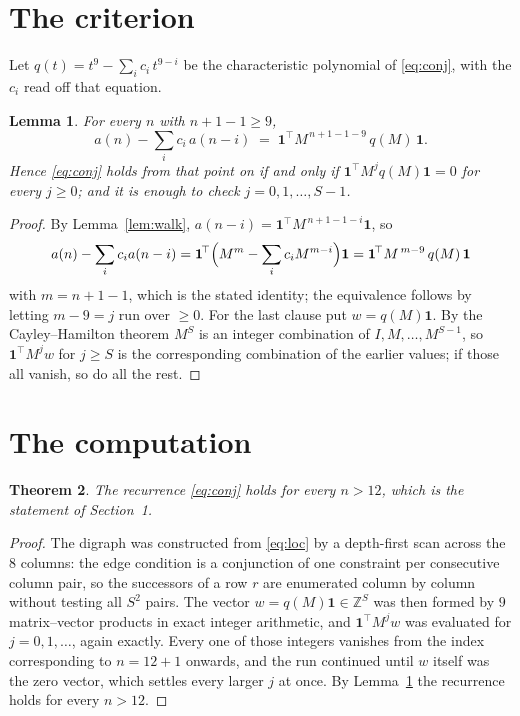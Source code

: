 \documentclass[11pt,a4paper]{article}
\theoremstyle{plain}
\newtheorem{theorem}{Theorem}
\newtheorem{lemma}[theorem]{Lemma}
\theoremstyle{definition}
\begin{document}
\section{The criterion}

Let $q(t)=t^{9}-\sum_i c_i\,t^{9-i}$ be the characteristic polynomial of
\eqref{eq:conj}, with the $c_i$ read off that equation.

\begin{lemma}\label{lem:crit}
For every $n$ with $n+1-1\ge9$,
\[
a(n)-\sum_i c_i\,a(n-i)\;=\;\mathbf{1}^{\!\top}M^{\,n+1-1-9}\,q(M)\,\mathbf{1} .
\]
Hence \eqref{eq:conj} holds from that point on if and only if
$\mathbf{1}^{\!\top}M^{j}q(M)\mathbf{1}=0$ for every $j\ge0$; and it is enough to check
$j=0,1,\dots,S-1$.
\end{lemma}

\begin{proof}
By Lemma~\ref{lem:walk}, $a(n-i)=\mathbf{1}^{\!\top}M^{\,n+1-1-i}\mathbf{1}$, so
\[
a(n)-\sum_i c_i a(n-i)
=\mathbf{1}^{\!\top}\Bigl(M^{m}-\sum_i c_i M^{m-i}\Bigr)\mathbf{1}
=\mathbf{1}^{\!\top}M^{\,m-9}\,q(M)\,\mathbf{1}
\]
with $m=n+1-1$, which is the stated identity; the equivalence follows by letting
$m-9=j$ run over $\ge0$. For the last clause put $w=q(M)\mathbf{1}$. By the
Cayley--Hamilton theorem $M^{S}$ is an integer combination of $I,M,\dots,M^{S-1}$, so
$\mathbf{1}^{\!\top}M^{j}w$ for $j\ge S$ is the corresponding combination of the earlier
values; if those all vanish, so do all the rest.
\end{proof}

\section{The computation}

\begin{theorem}
The recurrence \eqref{eq:conj} holds for every $n>12$, which is the statement of
Section~1.
\end{theorem}

\begin{proof}
The digraph was constructed from \eqref{eq:loc} by a depth-first scan across the $8$
columns: the edge condition is a conjunction of one constraint per consecutive column
pair, so the successors of a row $r$ are enumerated column by column without testing all
$S^2$ pairs. The vector $w=q(M)\mathbf{1}\in\mathbb{Z}^{S}$ was then formed by $9$
matrix--vector products in exact integer arithmetic, and $\mathbf{1}^{\!\top}M^{j}w$ was
evaluated for $j=0,1,\dots$, again exactly. Every one of those integers vanishes from the
index corresponding to $n=12+1$ onwards, and the run continued until $w$ itself was the
zero vector, which settles every larger $j$ at once. By Lemma~\ref{lem:crit} the recurrence
holds for every $n>12$.
\end{proof}
\end{document}
